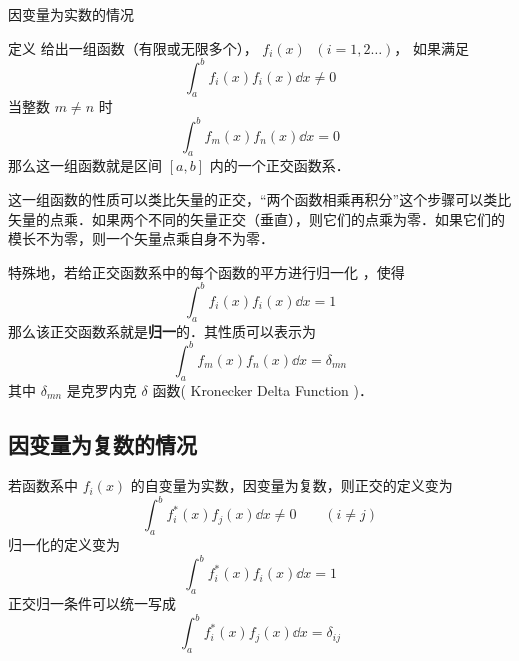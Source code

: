 
因变量为实数的情况

定义
给出一组函数（有限或无限多个）， ${f_i}(x)\;$ $( {i = 1,2\dots} )$，  如果满足
\begin{equation}
\int_a^b f_i(x) f_i(x) \dd{x} \ne 0
\end{equation} 
当整数 $m \ne n$ 时
\begin{equation}
\int_a^b f_m(x) f_n(x) \dd{x} = 0
\end{equation} 
那么这一组函数就是区间 $[a,b]$ 内的一个正交函数系．

这一组函数的性质可以类比矢量的正交，“两个函数相乘再积分”这个步骤可以类比矢量的点乘．如果两个不同的矢量正交（垂直），则它们的点乘为零．如果它们的模长不为零，则一个矢量点乘自身不为零．

特殊地，若给正交函数系中的每个函数的平方进行归一化%
，使得
\begin{equation}
\int_a^b f_i(x) f_i(x) \dd{x} = 1
\end{equation} 
那么该正交函数系就是\textbf{归一}的．其性质可以表示为
 \begin{equation}
\int_a^b f_m(x) f_n(x) \dd{x} = \delta _{mn}
\end{equation} 
其中 $\delta _{mn}$ 是克罗内克 $\delta$ 函数( Kronecker Delta Function )．


\subsection{因变量为复数的情况}

若函数系中 ${f_i}(x)$ 的自变量为实数，因变量为复数，则正交的定义变为
 \begin{equation}
\int_a^b f_i^*(x) f_j(x) \dd{x} \ne 0 \qquad ( i \ne j )
\end{equation}    
归一化的定义变为
 \begin{equation}
\int_a^b f_i^*(x) f_i(x) \dd{x} = 1
\end{equation} 
正交归一条件可以统一写成
 \begin{equation}
\int_a^b f_i^*(x) f_j(x) \dd{x} = \delta _{ij}
\end{equation}